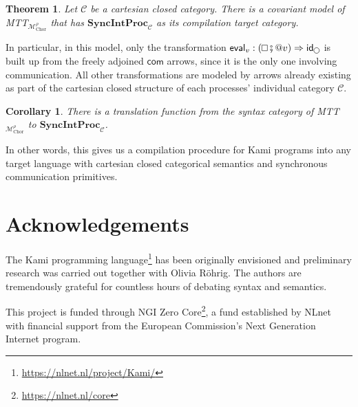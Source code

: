 \documentclass{scrartcl}
\theoremstyle{definition}
\theoremstyle{plain}
\newtheorem{theorem}{Theorem}
\newtheorem{corollary}{Corollary}
\renewcommand{\square}%
  {\tikz{\draw (0,0) rectangle (0.2cm,0.2cm);}}
\renewcommand{\circle}%
  {\tikz{\draw (0,0) circle [radius=0.1cm];}}
\begin{document}
\begin{theorem}
  Let $\mathcal{C}$ be a cartesian closed category. There is a covariant model
  of MTT${}_{\mathcal{M}^\rho_{\textrm{Chor}}}$ that has
  $\textbf{SyncIntProc}_{\mathcal{C}}$ as its compilation target category.
\end{theorem}
\vspace{0.5\baselineskip}
\noindent
In particular, in this model, only the transformation $\textsf{eval}_v :
(\square \fatsemi {}@ v) \Rightarrow \textsf{id}_{\circle}$ is built up from
the freely adjoined $\textsf{com}$ arrows, since it is the only one involving
communication. All other transformations are modeled by arrows already existing
as part of the cartesian closed structure of each processes' individual
category $\mathcal{C}$.
\begin{corollary}
  There is a translation function from the syntax category of
  MTT${}_{\mathcal{M}^\rho_{\textrm{Chor}}}$ to
  $\textbf{SyncIntProc}_{\mathcal{C}}$.
\end{corollary}
\vspace{0.5\baselineskip}
\noindent
In other words, this gives us a compilation procedure for Kami programs into
any target language with cartesian closed categorical semantics and synchronous
communication primitives.

\section*{Acknowledgements}
The Kami programming language\footnote{\url{https://nlnet.nl/project/Kami/}}
has been originally envisioned and preliminary research was carried out
together with Olivia R\"ohrig. The authors are tremendously grateful for
countless hours of debating syntax and semantics.

This project is funded through NGI Zero
Core\footnote{\url{https://nlnet.nl/core}}, a fund established by NLnet with
financial support from the European Commission's Next Generation Internet
program.



\end{document}
